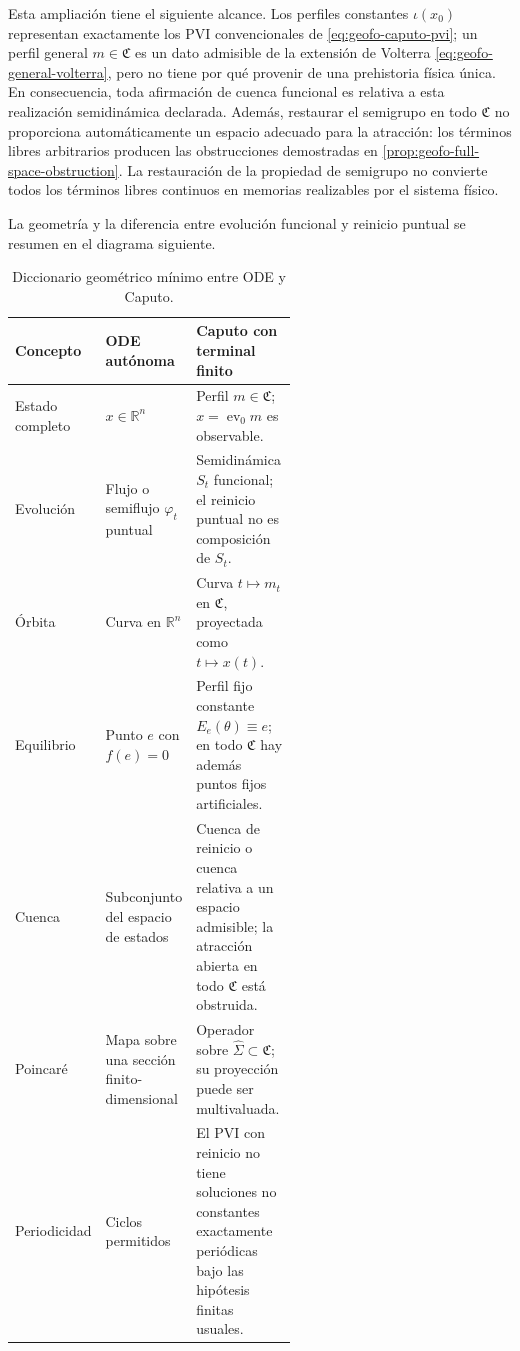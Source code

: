 Esta ampliación tiene el siguiente alcance. Los perfiles constantes
\(\iota(x_0)\) representan exactamente los PVI convencionales de
\cref{eq:geofo-caputo-pvi}; un perfil general \(m\in\mathfrak C\) es un dato
admisible de la extensión de Volterra
\cref{eq:geofo-general-volterra}, pero no tiene por qué provenir de una
prehistoria física única. En consecuencia, toda afirmación de cuenca funcional
es relativa a esta realización semidinámica declarada. Además, restaurar el
semigrupo en todo \(\mathfrak C\) no proporciona automáticamente un espacio
adecuado para la atracción: los términos libres arbitrarios producen las
obstrucciones demostradas en \cref{prop:geofo-full-space-obstruction}.
La restauración de la propiedad de semigrupo no convierte todos los términos
libres continuos en memorias realizables por el sistema físico.

La geometría y la diferencia entre evolución funcional y reinicio puntual se
resumen en el diagrama siguiente.



\begin{table}[ht]
\centering
\small
\caption{Diccionario geométrico mínimo entre ODE y Caputo.}
\label{tab:geofo-dictionary}
\begin{tabularx}{\linewidth}{@{}L{0.25\linewidth}L{0.31\linewidth}Y@{}}
\toprule
Concepto & ODE autónoma & Caputo con terminal finito \\
\midrule
Estado completo & \(x\in\mathbb R^n\) & Perfil
\(m\in\mathfrak C\); \(x=\operatorname{ev}_0m\) es observable.\\
Evolución & Flujo o semiflujo \(\varphi_t\) puntual & Semidinámica \(S_t\)
funcional; el reinicio puntual no es composición de \(S_t\).\\
Órbita & Curva en \(\mathbb R^n\) & Curva \(t\mapsto m_t\) en
\(\mathfrak C\), proyectada como \(t\mapsto x(t)\).\\
Equilibrio & Punto \(e\) con \(f(e)=0\) & Perfil fijo constante
\(E_e(\theta)\equiv e\); en todo \(\mathfrak C\) hay además puntos fijos
artificiales.\\
Cuenca & Subconjunto del espacio de estados & Cuenca de reinicio o cuenca
relativa a un espacio admisible; la atracción abierta en todo
\(\mathfrak C\) está obstruida.\\
Poincaré & Mapa sobre una sección finito-dimensional & Operador sobre
\(\widehat\Sigma\subset\mathfrak C\); su proyección puede ser multivaluada.\\
Periodicidad & Ciclos permitidos & El PVI con reinicio no tiene soluciones
no constantes exactamente periódicas bajo las hipótesis finitas usuales.\\
\bottomrule
\end{tabularx}
\end{table}

